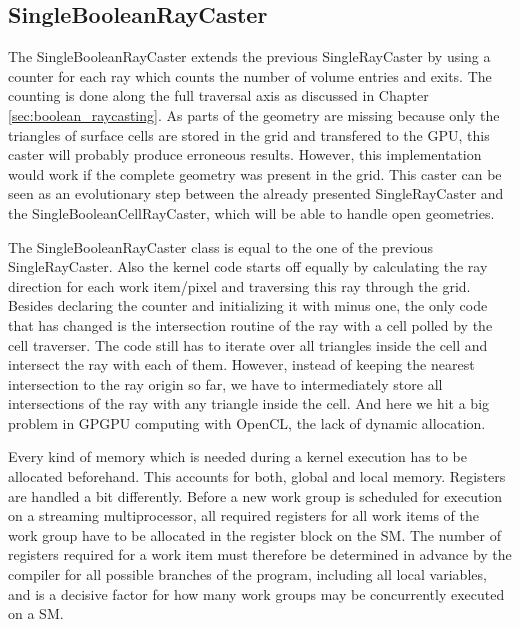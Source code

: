 \subsection{SingleBooleanRayCaster}
\label{sec:single_boolean}

The SingleBooleanRayCaster extends the previous SingleRayCaster by using a counter for each ray which counts the number of volume entries and exits. The counting is done along the full traversal axis as discussed in Chapter \ref{sec:boolean_raycasting}. As parts of the geometry are missing because only the triangles of surface cells are stored in the grid and transfered to the GPU, this caster will probably produce erroneous results. However, this implementation would work if the complete geometry was present in the grid. This caster can be seen as an evolutionary step between the already presented SingleRayCaster and the SingleBooleanCellRayCaster, which will be able to handle open geometries.

The SingleBooleanRayCaster class is equal to the one of the previous SingleRayCaster. Also the kernel code starts off equally by calculating the ray direction for each work item/pixel and traversing this ray through the grid. Besides declaring the counter and initializing it with minus one, the only code that has changed is the intersection routine of the ray with a cell polled by the cell traverser. The code still has to iterate over all triangles inside the cell and intersect the ray with each of them. However, instead of keeping the nearest intersection to the ray origin so far, we have to intermediately store all intersections of the ray with any triangle inside the cell. And here we hit a big problem in GPGPU computing with OpenCL, the lack of dynamic allocation.

Every kind of memory which is needed during a kernel execution has to be allocated beforehand. This accounts for both, global and local memory. Registers are handled a bit differently. Before a new work group is scheduled for execution on a streaming multiprocessor, all required registers for all work items of the work group have to be allocated in the register block on the SM. The number of registers required for a work item must therefore be determined in advance by the compiler for all possible branches of the program, including all local variables, and is a decisive factor for how many work groups may be concurrently executed on a SM.

